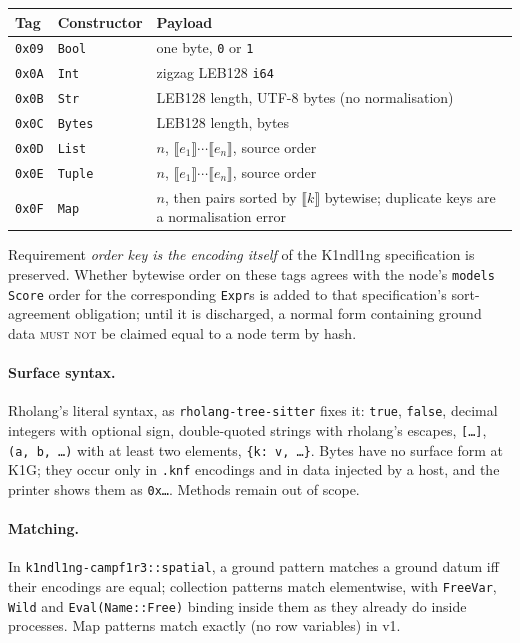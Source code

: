 \documentclass[11pt]{article}
\theoremstyle{definition}
\theoremstyle{remark}
\newcommand{\Kind}{K1ndl1ng}
\newcommand{\MUSTNOT}{\textsc{must not}}
\newcommand{\code}[1]{\texttt{#1}}
\newcommand{\enc}[1]{\llbracket #1 \rrbracket}
\begin{document}
\begin{center}\small
\begin{tabular}{@{}lll@{}}
\toprule
Tag & Constructor & Payload\\
\midrule
\code{0x09} & \code{Bool} & one byte, \code{0} or \code{1}\\
\code{0x0A} & \code{Int} & zigzag LEB128 \code{i64}\\
\code{0x0B} & \code{Str} & LEB128 length, UTF-8 bytes (no normalisation)\\
\code{0x0C} & \code{Bytes} & LEB128 length, bytes\\
\code{0x0D} & \code{List} & $n$, $\enc{e_1}\cdots\enc{e_n}$, source order\\
\code{0x0E} & \code{Tuple} & $n$, $\enc{e_1}\cdots\enc{e_n}$, source order\\
\code{0x0F} & \code{Map} & $n$, then pairs sorted by $\enc{k}$ bytewise; duplicate keys are a normalisation error\\
\bottomrule
\end{tabular}
\end{center}

\noindent
Requirement \emph{order key is the encoding itself} of the \Kind{} specification is
preserved. Whether bytewise order on these tags agrees with the node's
\code{models} \code{Score} order for the corresponding \code{Expr}s is added to that
specification's sort-agreement obligation; until it is discharged, a normal form
containing ground data \MUSTNOT{} be claimed equal to a node term by hash.

\paragraph{Surface syntax.} Rholang's literal syntax, as \code{rholang-tree-sitter}
fixes it: \code{true}, \code{false}, decimal integers with optional sign, double-quoted
strings with rholang's escapes, \code{[\ldots]}, \code{(a, b, \ldots)} with at least
two elements, \code{\{k: v, \ldots\}}. Bytes have no surface form at K1G; they occur
only in \code{.knf} encodings and in data injected by a host, and the printer shows
them as \code{0x\ldots}. Methods remain out of scope.

\paragraph{Matching.} In \code{k1ndl1ng-campf1r3::spatial}, a ground pattern matches
a ground datum iff their encodings are equal; collection patterns match elementwise,
with \code{FreeVar}, \code{Wild} and \code{Eval(Name::Free)} binding inside them as
they already do inside processes. Map patterns match exactly (no row
variables) in v1.
\end{document}
